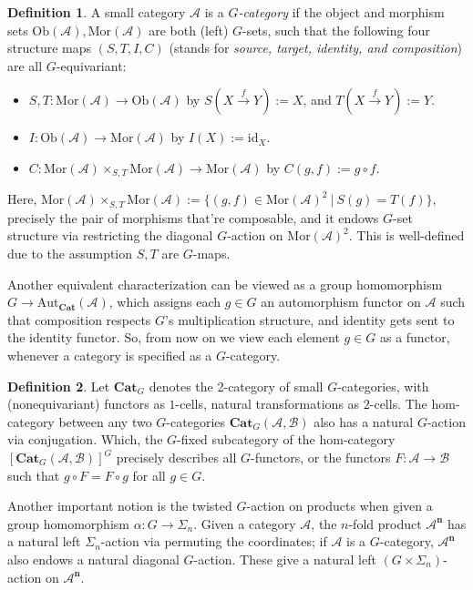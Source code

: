 \documentclass[openany, amssymb, psamsfonts]{amsart}
\theoremstyle{definition}
\newtheorem{defn}{Definition}[section]
\numberwithin{equation}{section}
\newcommand{\Cat}{\mathbf{Cat}} %
\newcommand{\A}{\mathscr{A}}
\newcommand{\B}{\mathscr{B}}
\newcommand{\id}{\mathrm{id}} %
\newcommand{\Aut}{\mathrm{Aut}} %
\newcommand{\Mor}{\mathrm{Mor}} %
\newcommand{\Ob}{\mathrm{Ob}}%
\begin{document}
\begin{defn}\label{defn_G_cat}
    A small category $\A$ is a \emph{$G$-category} if the object and morphism sets $\Ob(\A), \Mor(\A)$ are both (left) $G$-sets, such that the following four structure maps $(S,T,I,C)$ (stands for \emph{source, target, identity, and composition}) are all $G$-equivariant:
    \begin{itemize}
        \item $S,T:\Mor(\A)\rightarrow\Ob(\A)$ by $S(X\xrightarrow{f}Y):= X$, and $T(X\xrightarrow{f}Y):= Y$.
        \item $I:\Ob(\A)\rightarrow\Mor(\A)$ by $I(X):= \id_X$.
        \item $C:\Mor(\A)\times_{S,T}\Mor(\A)\rightarrow\Mor(\A)$ by $C(g,f):= g\circ f$.
    \end{itemize}
    Here, $\Mor(\A)\times_{S,T}\Mor(\A):= \{(g,f)\in \Mor(\A)^2\ |\ S(g)=T(f)\}$, precisely the pair of morphisms that're composable, and it endows $G$-set structure via restricting the diagonal $G$-action on $\Mor(\A)^2$. This is well-defined due to the assumption $S,T$ are $G$-maps.
\end{defn}

Another equivalent characterization can be viewed as a group homomorphism $G\rightarrow\Aut_{\Cat}(\A)$, which assigns each $g\in G$ an automorphism functor on $\A$ such that composition respects $G$'s multiplication structure, and identity gets sent to the identity functor. So, from now on we view each element $g\in G$ as a functor, whenever a category is specified as a $G$-category. 

\vspace{1pt}

\begin{defn}\label{defn_cat_of_G_cat}
Let $\Cat_G$ denotes the 2-category of small $G$-categories, with (nonequivariant) functors as $1$-cells, natural transformations as $2$-cells. The hom-category between any two $G$-categories $\Cat_G(\A,\B)$ also has a natural $G$-action via conjugation.  Which, the $G$-fixed subcategory of the hom-category $[\Cat_G(\A,\B)]^G$ precisely describes all $G$-functors, or the functors $F:\A\rightarrow\B$ such that $g\circ F=F\circ g$ for all $g\in G$.
\end{defn}

\vspace{1pt}

Another important notion is the twisted $G$-action on products when given a group homomorphism $\alpha:G\rightarrow\Sigma_n$. Given a category $\A$, the $n$-fold product $\A^\mathbf{n}$ has a natural left $\Sigma_n$-action via permuting the coordinates; if $\A$ is a $G$-category, $\A^\mathbf{n}$ also endows a natural diagonal $G$-action. These give a natural left $(G\times \Sigma_n)$-action on $\A^\mathbf{n}$.
\end{document}
